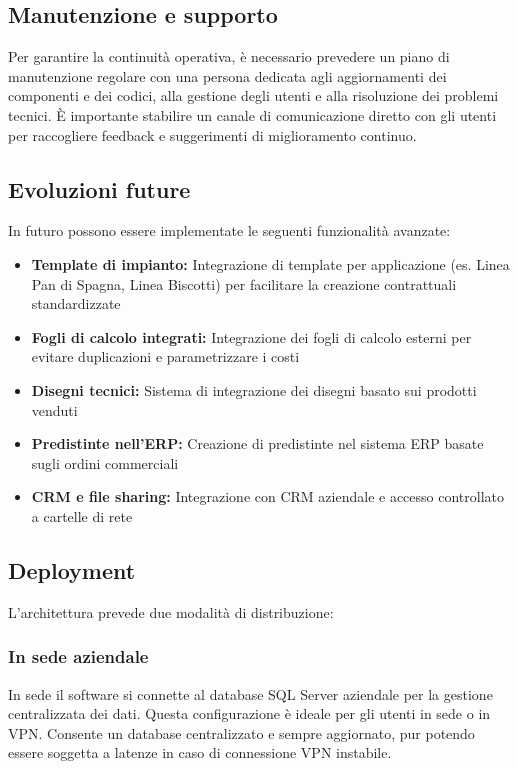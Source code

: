 \documentclass[12pt, a4paper]{article}
\begin{document}
\subsection{Manutenzione e supporto}

Per garantire la continuità operativa, è necessario prevedere un piano di manutenzione regolare con una persona dedicata agli aggiornamenti dei componenti e dei codici, alla gestione degli utenti e alla risoluzione dei problemi tecnici.
È importante stabilire un canale di comunicazione diretto con gli utenti per raccogliere feedback e suggerimenti di miglioramento continuo.

\subsection{Evoluzioni future}

In futuro possono essere implementate le seguenti funzionalità avanzate:

\begin{itemize}
      \item \textbf{Template di impianto:} Integrazione di template per applicazione (es. Linea Pan di Spagna, Linea Biscotti) per facilitare la creazione contrattuali standardizzate
      \item \textbf{Fogli di calcolo integrati:} Integrazione dei fogli di calcolo esterni per evitare duplicazioni e parametrizzare i costi
      \item \textbf{Disegni tecnici:} Sistema di integrazione dei disegni basato sui prodotti venduti
      \item \textbf{Predistinte nell'ERP:} Creazione di predistinte nel sistema ERP basate sugli ordini commerciali
      \item \textbf{CRM e file sharing:} Integrazione con CRM aziendale e accesso controllato a cartelle di rete
\end{itemize}

\subsection{Deployment}

L'architettura prevede due modalità di distribuzione:

\subsubsection{In sede aziendale}

In sede il software si connette al database SQL Server aziendale per la gestione centralizzata dei dati.
Questa configurazione è ideale per gli utenti in sede o in VPN.\@
Consente un database centralizzato e sempre aggiornato, pur potendo essere soggetta a latenze in caso di connessione VPN instabile.
\end{document}
